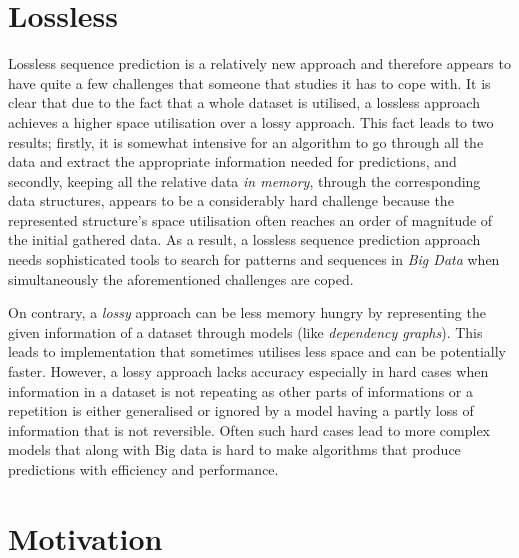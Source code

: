 \section{Lossless}
Lossless sequence prediction is a relatively new approach and therefore appears to have quite a few challenges that someone that studies it has to cope with. It is clear that due to the fact that a whole dataset is utilised, a lossless approach achieves a higher space utilisation over a lossy approach. This fact leads to two results; firstly, it is somewhat intensive for an algorithm to go through all the data and extract the appropriate information needed for predictions, and secondly, keeping all the relative data \emph{in memory}, through the corresponding data structures, appears to be a considerably hard challenge because the represented structure's space utilisation often reaches an order of magnitude of the initial gathered data. As a result, a lossless sequence prediction approach needs sophisticated tools to search for patterns and sequences in \emph{Big Data} when simultaneously the aforementioned challenges are coped.
\par On contrary, a \emph{lossy} approach can be less memory hungry by representing the given information of a dataset through models (like \emph{dependency graphs}). This leads to implementation that sometimes utilises less space and can be potentially faster. However, a lossy approach lacks accuracy especially in hard cases when information in a dataset is not repeating as other parts of informations or a repetition is either generalised or ignored by a model having a partly loss of information that is not reversible. Often such hard cases lead to more complex models that along with Big data is hard to make algorithms that produce predictions with efficiency and performance.
\section{Motivation}
